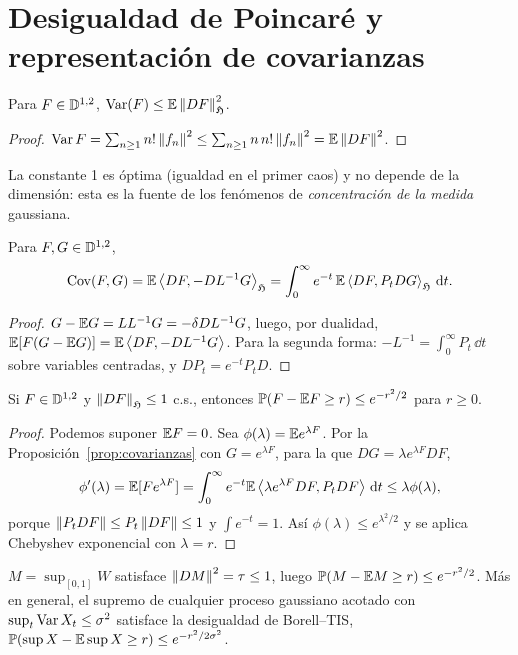 \section{Desigualdad de Poincaré y representación de covarianzas}

\begin{teorema}\label{teo:poincare}
Para $F\in\mathbb{D}^{1,2}$, $\operatorname{Var}(F)\le\mathbb{E}\left\lVert DF\right\rVert^2_{\mathfrak{H}}$.
\end{teorema}

\begin{proof}
$\operatorname{Var} F=\sum_{n\ge1}n!\left\lVert f_n\right\rVert^2\le\sum_{n\ge1}n\,n!\left\lVert f_n\right\rVert^2=\mathbb{E}\left\lVert DF\right\rVert^2$.
\end{proof}

La constante 1 es óptima (igualdad en el primer caos) y no depende de la dimensión: esta
es la fuente de los fenómenos de \emph{concentración de la medida} gaussiana.

\begin{proposicion}\label{prop:covarianzas}
Para $F,G\in\mathbb{D}^{1,2}$,
\[
  \operatorname{Cov}(F,G)=\mathbb{E}\left\langle DF, -DL^{-1}G\right\rangle_{\mathfrak{H}}=\int_0^\infty e^{-t}\,\mathbb{E}\left\langle DF, P_tDG\right\rangle_{\mathfrak{H}}\,\mathrm{d} t.
\]
\end{proposicion}

\begin{proof}
$G-\mathbb{E} G=LL^{-1}G=-\delta DL^{-1}G$, luego, por dualidad, $\mathbb{E}[F(G-\mathbb{E} G)]=
\mathbb{E}\left\langle DF, -DL^{-1}G\right\rangle$. Para la segunda forma: $-L^{-1}=\int_0^\infty P_t\,\dd t$ sobre variables centradas, y
$DP_t=e^{-t}P_tD$.
\end{proof}

\begin{corolario}
Si $F\in\mathbb{D}^{1,2}$ y $\left\lVert DF\right\rVert_{\mathfrak{H}}\le1$ c.s., entonces $\mathbb{P}(F-\mathbb{E} F\ge
r)\le e^{-r^2/2}$ para $r\ge0$.
\end{corolario}

\begin{proof}
Podemos suponer $\mathbb{E} F=0$. Sea $\phi(\lambda)=\mathbb{E} e^{\lambda F}$. Por la Proposición~\ref{prop:covarianzas} con
$G=e^{\lambda F}$, para la que $DG=\lambda e^{\lambda F}DF$,
\[
  \phi'(\lambda)=\mathbb{E}[Fe^{\lambda F}]=\int_0^\infty e^{-t}\mathbb{E}\left\langle \lambda e^{\lambda F}DF, P_tDF\right\rangle\,\mathrm{d} t\le\lambda\phi(\lambda),
\]
porque $\left\lVert P_tDF\right\rVert\le P_t\left\lVert DF\right\rVert\le1$ y $\int e^{-t}=1$. Así $\phi(\lambda)\le e^{\lambda^2/2}$ y se aplica Chebyshev exponencial
con $\lambda=r$.
\end{proof}

\begin{ejemplo}
$M=\sup_{[0,1]}W$ satisface $\left\lVert DM\right\rVert^2=\tau\le1$, luego $\mathbb{P}(M-\mathbb{E} M\ge r)\le e^{-r^2/2}$. Más
en general, el supremo de cualquier proceso gaussiano acotado con $\sup_t\operatorname{Var} X_t\le\sigma^2$ satisface la
desigualdad de Borell--TIS, $\mathbb{P}(\sup X-\mathbb{E}\sup X\ge r)\le e^{-r^2/2\sigma^2}$.
\end{ejemplo}


